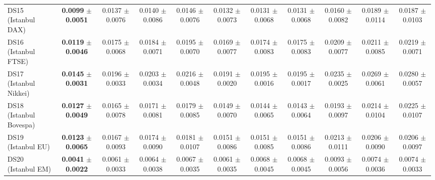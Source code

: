 \begin{table}[t]
{{\begin{tabular}{lcccccccccc}
DS15 (Istanbul DAX) & \textbf{0.0099} $\pm$ \textbf{0.0051} & 0.0137 $\pm$ 0.0076 & 0.0140 $\pm$ 0.0086 & 0.0146 $\pm$ 0.0076 & 0.0132 $\pm$ 0.0073 & 0.0131 $\pm$ 0.0068 & 0.0131 $\pm$ 0.0068 & 0.0160 $\pm$ 0.0082 & 0.0189 $\pm$ 0.0114 & 0.0187 $\pm$ 0.0103 \\
DS16 (Istanbul FTSE) & \textbf{0.0119} $\pm$ \textbf{0.0046} & 0.0175 $\pm$ 0.0068 & 0.0184 $\pm$ 0.0071 & 0.0195 $\pm$ 0.0070 & 0.0169 $\pm$ 0.0077 & 0.0174 $\pm$ 0.0083 & 0.0175 $\pm$ 0.0083 & 0.0209 $\pm$ 0.0077 & 0.0211 $\pm$ 0.0085 & 0.0219 $\pm$ 0.0071 \\
DS17 (Istanbul Nikkei) & \textbf{0.0145} $\pm$ \textbf{0.0031} & 0.0196 $\pm$ 0.0033 & 0.0203 $\pm$ 0.0034 & 0.0216 $\pm$ 0.0048 & 0.0191 $\pm$ 0.0020 & 0.0195 $\pm$ 0.0016 & 0.0195 $\pm$ 0.0017 & 0.0235 $\pm$ 0.0025 & 0.0269 $\pm$ 0.0061 & 0.0280 $\pm$ 0.0057 \\
DS18 (Istanbul Bovespa) & \textbf{0.0127} $\pm$ \textbf{0.0049} & 0.0165 $\pm$ 0.0078 & 0.0171 $\pm$ 0.0081 & 0.0179 $\pm$ 0.0085 & 0.0149 $\pm$ 0.0070 & 0.0144 $\pm$ 0.0065 & 0.0143 $\pm$ 0.0064 & 0.0193 $\pm$ 0.0097 & 0.0214 $\pm$ 0.0104 & 0.0225 $\pm$ 0.0107 \\
DS19 (Istanbul EU) & \textbf{0.0123} $\pm$ \textbf{0.0065} & 0.0167 $\pm$ 0.0093 & 0.0174 $\pm$ 0.0090 & 0.0181 $\pm$ 0.0107 & 0.0151 $\pm$ 0.0086 & 0.0151 $\pm$ 0.0085 & 0.0151 $\pm$ 0.0086 & 0.0213 $\pm$ 0.0111 & 0.0206 $\pm$ 0.0090 & 0.0206 $\pm$ 0.0097 \\
DS20 (Istanbul EM) & \textbf{0.0041} $\pm$ \textbf{0.0022} & 0.0061 $\pm$ 0.0033 & 0.0064 $\pm$ 0.0038 & 0.0067 $\pm$ 0.0035 & 0.0061 $\pm$ 0.0035 & 0.0068 $\pm$ 0.0045 & 0.0068 $\pm$ 0.0045 & 0.0093 $\pm$ 0.0056 & 0.0074 $\pm$ 0.0036 & 0.0074 $\pm$ 0.0033 \\
\bottomrule
\end{tabular}%
}%
}
\end{table}
